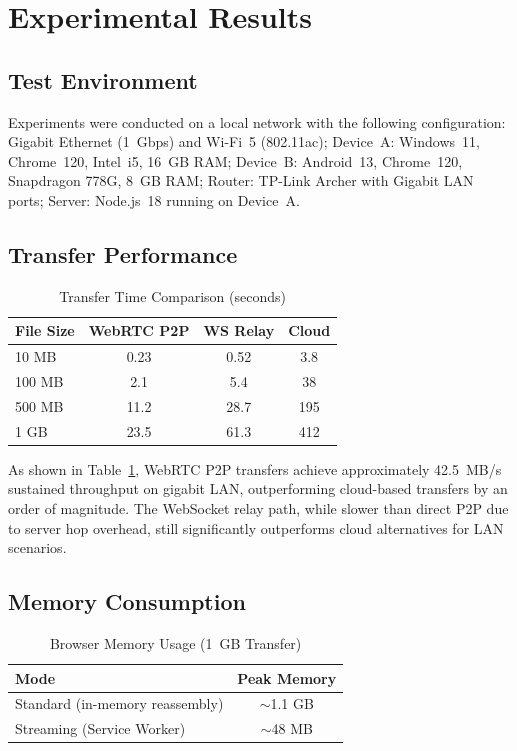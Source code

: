 \documentclass[conference]{IEEEtran}
\begin{document}
\section{Experimental Results}

\subsection{Test Environment}
Experiments were conducted on a local network with the following configuration: Gigabit Ethernet (1~Gbps) and Wi-Fi~5 (802.11ac); Device~A: Windows~11, Chrome~120, Intel~i5, 16~GB RAM; Device~B: Android~13, Chrome~120, Snapdragon 778G, 8~GB RAM; Router: TP-Link Archer with Gigabit LAN ports; Server: Node.js~18 running on Device~A.

\subsection{Transfer Performance}

\begin{table}[htbp]
\caption{Transfer Time Comparison (seconds)}
\label{tab:transferperf}
\centering
\begin{tabular}{@{}lccc@{}}
\toprule
\textbf{File Size} & \textbf{WebRTC P2P} & \textbf{WS Relay} & \textbf{Cloud} \\
\midrule
10 MB & 0.23 & 0.52 & 3.8 \\
100 MB & 2.1 & 5.4 & 38 \\
500 MB & 11.2 & 28.7 & 195 \\
1 GB & 23.5 & 61.3 & 412 \\
\bottomrule
\end{tabular}
\end{table}

As shown in Table~\ref{tab:transferperf}, WebRTC P2P transfers achieve approximately 42.5~MB/s sustained throughput on gigabit LAN, outperforming cloud-based transfers by an order of magnitude. The WebSocket relay path, while slower than direct P2P due to server hop overhead, still significantly outperforms cloud alternatives for LAN scenarios.

\subsection{Memory Consumption}

\begin{table}[htbp]
\caption{Browser Memory Usage (1~GB Transfer)}
\label{tab:memory}
\centering
\begin{tabular}{@{}lc@{}}
\toprule
\textbf{Mode} & \textbf{Peak Memory} \\
\midrule
Standard (in-memory reassembly) & $\sim$1.1 GB \\
Streaming (Service Worker) & $\sim$48 MB \\
\bottomrule
\end{tabular}
\end{table}
\end{document}
